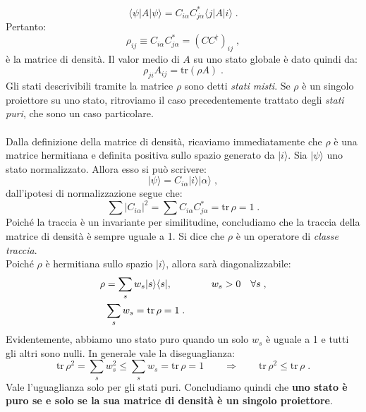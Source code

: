\documentclass[10pt,a4paper]{report}
\theoremstyle{definition}
\numberwithin{equation}{section}
\newcommand{\bra}{\langle}
\newcommand{\ket}{\rangle}
\newcommand{\adj}[1]{#1^{\dagger}}
\newcommand{\tr}{\mathrm{tr}}
\begin{document}
\begin{equation}
\bra\psi|A|\psi\ket =C_{i\alpha}C_{j\alpha}^*\bra j|A|i\ket\;.
\end{equation}
Pertanto:
\begin{equation}
\rho_{ij}\equiv C_{i\alpha}C_{j\alpha}^*=(C\adj{C})_{ij}\;,
\end{equation}
è la matrice di densità. Il valor medio di $A$ su uno stato globale è dato quindi da:
\begin{equation}
\rho_{ji}A_{ij}=\tr(\rho A)\;.
\end{equation}
Gli stati descrivibili tramite la matrice $\rho$ sono detti \textit{stati misti}. Se $\rho$ è un singolo proiettore su uno stato, ritroviamo il caso precedentemente trattato degli \textit{stati puri}, che sono un caso particolare. \\
\\
Dalla definizione della matrice di densità, ricaviamo immediatamente che $\rho$ è una matrice hermitiana e definita positiva sullo spazio generato da $|i\ket$. Sia $|\psi\ket$ uno stato normalizzato. Allora esso si può scrivere:
\begin{equation}
|\psi\ket=C_{i\alpha}|i\ket|\alpha\ket\;,
\end{equation}
dall'ipotesi di normalizzazione segue che:
\begin{equation}
\sum |C_{i\alpha}|^2=\sum C_{i\alpha}C_{j\alpha}^*=\tr\, \rho =1\;.
\end{equation}
Poiché la traccia è un invariante per similitudine, concludiamo che la traccia della matrice di densità è sempre uguale a 1. Si dice che $\rho$ è un operatore di \textit{classe traccia}. \\
Poiché $\rho$ è hermitiana sullo spazio $|i\ket$, allora sarà diagonalizzabile:
\begin{align}
\rho &= \sum_s w_s|s\ket\bra s|, \qquad \qquad w_s>0\quad \forall s \notag \;,\\
&\sum_s w_s=\tr\, \rho = 1\;.
\end{align}
Evidentemente, abbiamo uno stato puro quando un solo $w_s$ è uguale a 1 e tutti gli altri sono nulli. In generale vale la diseguaglianza:
\begin{equation}
\tr\, \rho^2=\sum_s w_s^2\le \sum_s w_s=\tr\,\rho=1 \qquad \Longrightarrow \qquad \tr\,\rho^2\le \tr\,\rho\;.
\end{equation}
Vale l'uguaglianza solo per gli stati puri. Concludiamo quindi che \textbf{uno stato è puro se e solo se la sua matrice di densità è un singolo proiettore}. \\
\end{document}

